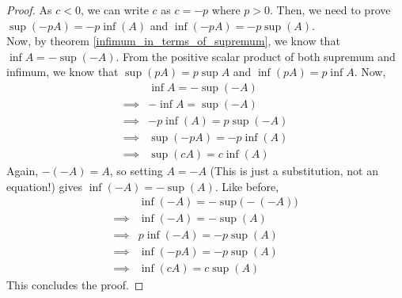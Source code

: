 \begin{proof}
    As $c<0$, we can write $c$ as $c=-p$ where $p>0$. Then, we need to prove $\sup(-pA)=-p\inf(A)$ and $\inf(-pA)=-p\sup(A)$.\\
    Now, by theorem \eqref{infimum_in_terms_of_supremum}, we know that $\inf A=-\sup(-A)$. From the positive scalar product of both supremum and infimum, we know that $\sup(pA)=p\sup A$ and $\inf(pA)=p\inf A$. Now,
    \begin{align*}
        & \inf A=-\sup(-A)\\
        \implies& -\inf A=\sup(-A)\\
        \implies& -p\inf(A)=p\sup(-A)\\
        \implies&\sup(-pA)=-p\inf(A)\\
        \implies&\boxed{\sup(cA)=c\inf(A)}
    \end{align*}
    Again, $-(-A)=A$, so setting $A=-A$ (This is just a substitution, not an equation!) gives $\inf(-A)=-\sup(A)$.
    Like before,
    \begin{align*}
        &\inf(-A)=-\sup\big(-(-A)\big)\\
        \implies&\inf(-A)=-\sup(A)\\
        \implies&p\inf(-A)=-p\sup(A)\\
        \implies&\inf(-pA)=-p\sup(A)\\
        \implies&\boxed{\inf(cA)=c\sup(A)}
    \end{align*}
    This concludes the proof.
\end{proof}
\exercise
